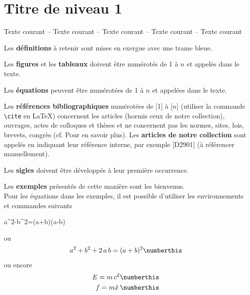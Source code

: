 \documentclass[a4paper,12pt]{article}
\begin{document}
\section{Titre de niveau 1}\label{sec:niveau1}

Texte courant --  Texte courant -- Texte courant -- Texte courant -- Texte courant\newline

\begin{Definition}
	Les \textbf{d\'efinitions} \`a retenir sont mises en exergue avec une trame bleue.\newline
\end{Definition}


Les \textbf{figures} et les \textbf{tableaux} doivent \^etre num\'erot\'es de 1 \`a $n$ et appel\'es dans le texte.\newline

Les \textbf{\'equations} peuvent \^etre num\'erot\'ees de 1 \`a $n$ et appel\'ees dans le texte.\newline

Les \textbf{r\'ef\'erences bibliographiques} num\'erot\'ees de [1] \`a [$n$] (utiliser la commande \verb?\cite? en \LaTeX) concernent les articles (hormis ceux de notre collection), ouvrages, actes de colloques et th\`eses et ne concernent pas les normes, sites, lois, brevets, congr\`es (cf. \og Pour en savoir plus\fg). Les \textbf{articles de notre collection} sont appel\'es en indiquant leur r\'ef\'erence interne, par exemple [D2901] (\`a r\'ef\'erencer manuellement).\newline

Les \textbf{sigles} doivent \^etre d\'evelopp\'es \`a leur premi\`ere occurrence.\newline

\begin{Exemple}
	\label{exemple:ex1}
	Les \textbf{exemples} pr\'esent\'es de cette mani\`ere sont les bienvenus.\\
	Pour les \'equations dans les exemples, il est possible d'utiliser les environnements et commandes suivants
	\begin{equationExemple}
		a^2-b^2=(a+b)(a-b)
	\end{equationExemple}
	ou
	\begin{equation*}
		a^2+b^2+2\,a\,b=(a+b)^2 \numberthis
	\end{equation*}
	ou encore
	\begin{align*}
		E=m\,c^2 \numberthis\\ 
		f=m\ddot{x}\, \numberthis
	\end{align*}
\end{Exemple}
\end{document}
